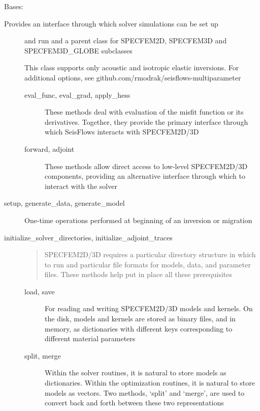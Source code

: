 \documentclass[letterpaper,10pt,english]{sphinxmanual}
\begin{document}
\begin{fulllineitems}
\label{\detokenize{ref/seisflows.solver:seisflows.solver.base.base}}
Bases: 
\begin{description}
\item[{Provides an interface through which solver simulations can be set up}] \leavevmode
and run and a parent class for SPECFEM2D, SPECFEM3D and SPECFEM3D\_GLOBE
subclasses

This class supports only acoustic and isotropic elastic inversions.
For additional options, see github.com/rmodrak/seisflows-multiparameter
\begin{description}
\item[{eval\_func, eval\_grad, apply\_hess}] \leavevmode
These methods deal with evaluation of the misfit function or its
derivatives.  Together, they provide the primary interface through
which SeisFlows interacts with SPECFEM2D/3D

\item[{forward, adjoint}] \leavevmode
These methods allow direct access to low-level SPECFEM2D/3D components,
providing an alternative interface through which to interact with the
solver

\end{description}

\item[{setup, generate\_data, generate\_model}] \leavevmode
One-time operations performed at beginning of an inversion or
migration

\item[{initialize\_solver\_directories, initialize\_adjoint\_traces}] \leavevmode\begin{quote}

SPECFEM2D/3D requires a particular directory structure in which to run
and particular file formats for models, data, and parameter files.
These methods help put in place all these prerequisites
\end{quote}
\begin{description}
\item[{load, save}] \leavevmode
For reading and writing SPECFEM2D/3D models and kernels. On the disk,
models and kernels are stored as binary files, and in memory, as
dictionaries with different keys corresponding to different material
parameters

\item[{split, merge}] \leavevmode
Within the solver routines, it is natural to store models as
dictionaries. Within the optimization routines, it is natural to store
models as vectors. Two methods, ‘split’ and ‘merge’, are used to
convert back and forth between these two representations


\end{description}
\end{description}
\end{fulllineitems}
\end{document}
